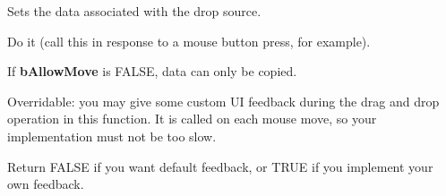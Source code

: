 
\label{wxdropsourcesetdata}


Sets the data  associated with the drop source.

\label{wxdropsourcedodragdrop}


Do it (call this in response to a mouse button press, for example).

If {\bf bAllowMove} is FALSE, data can only be copied.

\label{wxdropsourcegivefeedback}


Overridable: you may give some custom UI feedback during the drag and drop operation
in this function. It is called on each mouse move, so your implementation must not be too
slow.





Return FALSE if you want default feedback, or TRUE if you implement your own
feedback.

